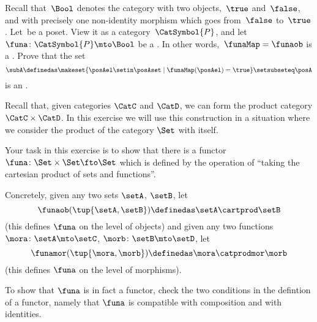 \begin{marginfigure}
    \centering
    \caption{}
    \label{fig:graph-cat}
\end{marginfigure}

\begin{gradedexercise}
    \label{ex:UpperSetsViaFunctors}
    Recall that~$\Bool$ denotes the category with two objects,~$\true$ and~$\false$, and with precisely one non-identity morphism which goes from~$\false$ to~$\true$.
    Let~\posA be a poset.
    View it as a category~$\CatSymbol{P}$, and let~$\funa \colon \CatSymbol{P} \mto \Bool$ be a .
    In other words,~$\funaMap = \funaob$ is a .
    Prove that the set
    \begin{equation}
        \subA \definedas \makeset{ \posAel \setin \posAset \mid \funaMap(\posAel) = \true } \setsubseteq \posA
    \end{equation}
    is an .
\end{gradedexercise}

\begin{gradedexercise}
    \label{ex:CartProdAsFunctor}

    Recall that, given categories $\CatC$ and $\CatD$, we can form the product category $\CatC \times \CatD$.
    In this exercise we will use this construction in a situation where we consider the product of the category $\Set$ with itself.

    Your task in this exercise is to show that there is a functor $\funa \colon \Set \times \Set \fto \Set$ which is defined by the operation of ``taking the cartesian product of sets and functions''.

    Concretely, given any two sets $\setA$, $\setB$, let
    \begin{equation*}
        \funaob(\tup{\setA, \setB}) \definedas \setA \cartprod \setB
    \end{equation*}
    (this defines $\funa$ on the level of objects) and given any two functions $\mora \colon \setA \mto \setC$, $\morb \colon \setB \mto \setD$, let
    \begin{equation*}
        \funamor(\tup{\mora, \morb}) \definedas \mora \catprodmor \morb
    \end{equation*}
    (this defines $\funa$ on the level of morphisms).

    To show that $\funa$ is in fact a functor, check the two conditions in the defintion of a functor, namely that $\funa$ is compatible with composition and with identities.
\end{gradedexercise}

